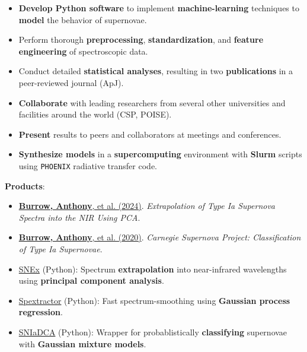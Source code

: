 \documentclass[letterpaper,11pt]{article}
\newcommand{\smallHeading}[1]{\small{\textbf{#1}:\vspace{-5pt}}}
\newcommand{\paperEntryShort}[4]{
  \href{https://doi.org/#1}{\textbf{Burrow, Anthony}, et al. (#2)}.
  \textit{#3}. #4
}
\newcommand{\emphasize}[1]{\textbf{#1}}
\begin{document}
    \begin{itemize}\small
      \item \emphasize{Develop Python software} to implement
        \emphasize{machine-learning} techniques to \emphasize{model} the
        behavior of supernovae.
      \item Perform thorough \emphasize{preprocessing},
        \emphasize{standardization}, and \emphasize{feature engineering} of
        spectroscopic data.
      \item Conduct detailed \emphasize{statistical analyses}, resulting in two
        \emphasize{publications} in a peer-reviewed journal (ApJ).
      \item \emphasize{Collaborate} with leading researchers from several other
        universities and facilities around the world (CSP, POISE).
      \item \emphasize{Present} results to peers and collaborators at meetings
        and conferences.
      \item \emphasize{Synthesize models} in a \emphasize{supercomputing}
        environment with \emphasize{Slurm} scripts using \texttt{PHOENIX}
        radiative transfer code.
    \end{itemize}
    \hspace*{1.1em}\smallHeading{Products}
    \begin{itemize}\small
      \item \paperEntryShort{10.3847/1538-4357/ad3c45}{2024}
            {Extrapolation of Type Ia Supernova Spectra into the NIR Using PCA}
            {\apj}
      \item \paperEntryShort{10.3847/1538-4357/abafa2}{2020}
            {Carnegie Supernova Project: Classification of Type Ia Supernovae}
            {\apj}
      \item \href{https://github.com/anthonyburrow/SNEx}{SNEx} (Python):
        Spectrum \emphasize{extrapolation} into near-infrared wavelengths using
        \emphasize{principal component analysis}.
      \item \href{https://github.com/anthonyburrow/spextractor}{Spextractor} (Python):
        Fast spectrum-smoothing using \emphasize{Gaussian process regression}.
      \item \href{https://github.com/anthonyburrow/SNIaDCA}{SNIaDCA} (Python):
        Wrapper for probablistically \emphasize{classifying} supernovae with
        \emphasize{Gaussian mixture models}.
    \end{itemize}\vspace{-5pt}
\end{document}
